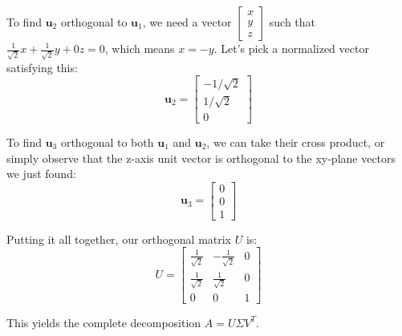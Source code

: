 To find $\mathbf{u}_2$ orthogonal to $\mathbf{u}_1$, we need a vector $\begin{bmatrix} x \\ y \\ z \end{bmatrix}$ such that $\frac{1}{\sqrt{2}}x + \frac{1}{\sqrt{2}}y + 0z = 0$, which means $x = -y$. Let's pick a normalized vector satisfying this:
\[
	\mathbf{u}_2 = \begin{bmatrix} -1/\sqrt{2} \\ 1/\sqrt{2} \\ 0 \end{bmatrix}
\]

To find $\mathbf{u}_3$ orthogonal to both $\mathbf{u}_1$ and $\mathbf{u}_2$, we can take their cross product, or simply observe that the z-axis unit vector is orthogonal to the xy-plane vectors we just found:
\[
	\mathbf{u}_3 = \begin{bmatrix} 0 \\ 0 \\ 1 \end{bmatrix}
\]

Putting it all together, our orthogonal matrix $U$ is:
\[
	U = \begin{bmatrix} \frac{1}{\sqrt{2}} & -\frac{1}{\sqrt{2}} & 0 \\ \frac{1}{\sqrt{2}} & \frac{1}{\sqrt{2}} & 0 \\ 0 & 0 & 1 \end{bmatrix}
\]

This yields the complete decomposition $A = U\Sigma V^T$.


